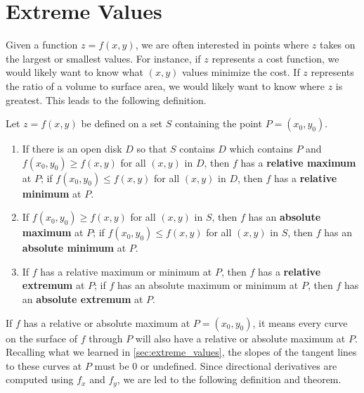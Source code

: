 \section{Extreme Values}\label{sec:multi_extreme_values}

Given a function $z=f(x,y)$, we are often interested in points where $z$ takes on the largest or smallest values. For instance, if $z$ represents a cost function, we would likely want to know what $(x,y)$ values minimize the cost. If $z$ represents the ratio of a volume to surface area, we would likely want to know where $z$ is greatest. This leads to the following definition.

\begin{definition}\label{def:multi_extrema}%
Let $z=f(x,y)$ be defined on a set $S$ containing the point $P=(x_0,y_0)$.
\begin{enumerate}
	\item If there is an open disk $D$ so that $S$ contains $D$ which contains $P$ and $f(x_0,y_0) \geq f(x,y)$ for all $(x,y)$ in $D$, then $f$ has a \textbf{relative maximum} at $P$; if $f(x_0,y_0) \leq f(x,y)$ for all $(x,y)$ in $D$, then $f$ has a \textbf{relative minimum} at $P$.
	
	\item	If $f(x_0,y_0)\geq f(x,y)$ for all $(x,y)$ in $S$, then $f$ has an \textbf{absolute maximum} at $P$; if $f(x_0,y_0)\leq f(x,y)$ for all $(x,y)$ in $S$, then $f$ has an \textbf{absolute minimum} at $P$.
	
	\item		If $f$ has a relative maximum or minimum at $P$, then $f$ has a \textbf{relative extremum} at $P$; if $f$ has an absolute maximum or minimum at $P$, then $f$ has an \textbf{absolute extremum} at $P$.
\end{enumerate}
\end{definition}

If $f$ has a relative or absolute maximum at $P=(x_0,y_0)$, it means every curve on the surface of $f$ through $P$ will also have a relative or absolute maximum at $P$. Recalling what we learned in \autoref{sec:extreme_values}, the slopes of the tangent lines to these curves at $P$ must be 0 or undefined. Since directional derivatives are computed using $f_x$ and $f_y$, we are led to the following definition and theorem.

